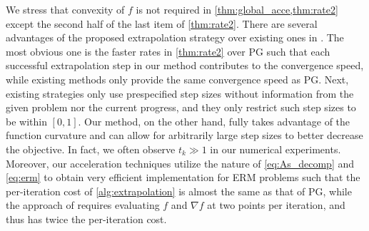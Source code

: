 \documentclass{article}
\newcommand{\alert}[1]{{#1}}
\newcommand{\Alertt}[1]{{#1}}
\theoremstyle{plain}
\theoremstyle{definition}
\theoremstyle{remark}
\newcommand{\cp}[1]{\footnote{\textbf{CP:} #1}}
\newcommand{\Tpg}{T_{\rm PG}^{\lambda}}
\begin{document}
\alert{We stress that convexity of $f$ is not required in 
	\cref{thm:global_acce,thm:rate2} \Alertt{except the second half of the
		last item of \cref{thm:rate2}}.} 
There are several advantages of the proposed extrapolation strategy
over existing ones in \cite{NIPS2015_f7664060,WCP18}.
The most obvious one is the faster rates in \cref{thm:rate2} over
PG such that each successful extrapolation step in our method
contributes to the convergence speed, while existing methods only
provide the same convergence speed as PG.
Next, existing strategies only use prespecified step sizes without information
from the given problem nor the current progress,
and they only restrict such step sizes to be within $[0,1]$.
Our method, on the other hand, fully takes advantage of the function
curvature and can allow for arbitrarily large step sizes to better
decrease the objective.
In fact, we often observe $t_k \gg 1$ in our numerical
experiments.
Moreover, our acceleration techniques utilize the nature of
\cref{eq:As_decomp} and \cref{eq:erm} to obtain very efficient
implementation for ERM problems such that the per-iteration cost of
\cref{alg:extrapolation} is almost the same as that of PG, while the approach of
\cite{NIPS2015_f7664060} requires evaluating $f$ and $\nabla f$ at two
points per iteration, and thus has twice the per-iteration cost.
\end{document}
